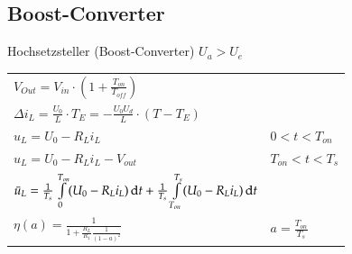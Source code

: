 \subsection{Boost-Converter}
\begin{minipage}{0.75\linewidth}
    Hochsetzsteller (Boost-Converter) $U_a > U_e  $\newline
    \renewcommand{\arraystretch}{2}
    \begin{tabular}{p{9cm} p{3cm}}
        $ V_{Out}=V_{in}\cdot \left(1+\frac{T_{on}}{T_{off}} \right)$&
        \\
        $ \varDelta i_L = \frac{U_0}{L}\cdot T_E=-\frac{U_0  U_d}{L}\cdot(T-T_E)$&\\
        
        $ u_L = U_0 - R_L i_L$&
        $ 0<t<T_{on} $\\
        
        $ u_L = U_0 - R_L i_L -V_{out}$&
        $T_{on}<t<T_{s} $\\
        
        $ \bar{u}_L=\frac{1}{T_s}\int\limits_{0}^{T_{on}}(U_0 - R_L i_L)\mathop{}\!\mathrm{d} t + \frac{1}{T_s}\int\limits_{T_{on}}^{T_s}(U_0 - R_L i_L)\mathop{}\!\mathrm{d} t $&
        \\
        
        $ \eta(a) = \frac{1}{1+\frac{R_L}{R_1}\frac{1}{(1-a)^2}} $ &
        $ a=\frac{T_{on}}{T_s} $\\
                     
    \end{tabular}
    \renewcommand{\arraystretch}{1}
\end{minipage}

